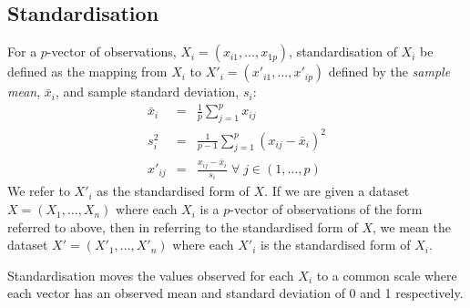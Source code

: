 \documentclass[12pt]{article} %
\begin{document}
\subsection{Standardisation} \label{sec:standardisation}
For a $p$-vector of observations, $X_i=(x_{i1},\ldots,x_{1p})$, standardisation of $X_i$ be defined as the mapping from $X_i$ to $X'_i=(x'_{i1},\ldots,x'_{ip})$ defined by the \emph{sample mean}, $\bar{x}_i$, and sample standard deviation, $s_i$:
\begin{eqnarray} \label{eqn:standardisation}
\bar{x}_i &=& \frac{1}{p}\sum_{j=1}^p x_{ij} \\
s_i^2 &=& \frac{1}{p - 1}\sum_{j=1}^p \left( x_{ij} - \bar{x}_i \right) ^2 \\
x'_{ij} &=& \frac{x_{ij}- \bar{x}_i}{s_i} \; \forall \; j \in (1,\ldots,p)
\end{eqnarray}
We refer to $X'_i$ as the standardised form of $X$. If we are given a dataset $X=(X_1,\ldots,X_n)$ where each $X_i$ is a $p$-vector of observations of the form referred to above, then in referring to the standardised form of $X$, we mean the dataset $X'=(X'_1,\ldots,X'_n)$ where each $X'_i$ is the standardised form of $X_i$.

Standardisation moves the values observed for each $X_i$ to a common scale where each vector has an observed mean and standard deviation of 0 and 1 respectively.
\end{document}
